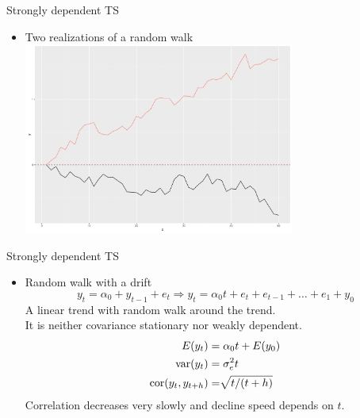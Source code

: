 \documentclass{beamer}
\begin{document}
\begin{frame}{Strongly dependent TS}
\begin{itemize}
\item Two realizations of a random walk \\
\vspace{0.5cm}
\includegraphics[width=0.7\textwidth]{img/random_walk.pdf}
\end{itemize}
\end{frame}
\begin{frame}{Strongly dependent TS}
\begin{itemize}
\item Random walk with a drift
$$ y_t=\alpha_0+y_{t-1}+e_t \Rightarrow y_t =\alpha_0 t + e_{t} + e_{t-1} +  \dots +e_1 + y_0$$
A linear trend with random walk around the trend. \\ It is neither covariance stationary nor weakly dependent.
\begin{align}\nonumber
E(y_t) & =\alpha_0 t +E(y_0)\\\nonumber
\textnormal{var}(y_t) & =\sigma^2_e t\\\nonumber
\textnormal{cor}(y_t,y_{t+h}) & =\sqrt[]{t/(t+h)}
\end{align} 
Correlation decreases very slowly and decline speed depends on $t$.
\end{itemize}
\end{frame}
\end{document}
